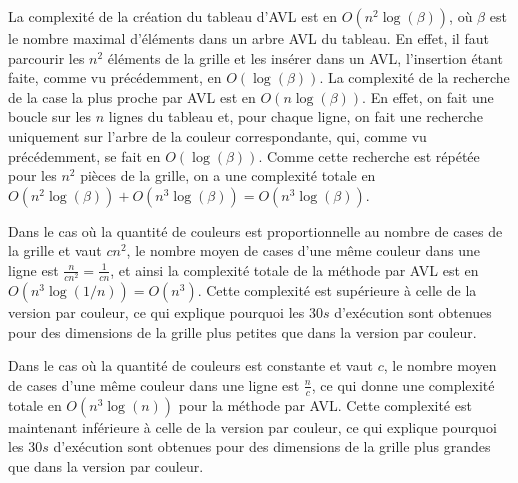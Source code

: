 \documentclass[a4paper,12pt]{article}
\numberwithin{equation}{section}
\begin{document}
La complexité de la création du tableau d'AVL est en $O(n^2 \log(\beta))$, où $\beta$ est le nom\-bre maximal d'éléments dans un arbre AVL du tableau. En effet, il faut parcourir les $n^2$ éléments de la grille et les insérer dans un AVL, l'insertion étant faite, comme vu précédemment, en $O(\log(\beta))$. La complexité de la recherche de la case la plus proche par AVL est en $O(n \log(\beta))$. En effet, on fait une boucle sur les $n$ lignes du tableau \verb@M@ et, pour chaque ligne, on fait une recherche uniquement sur l'arbre de la couleur correspondante, qui, comme vu précédemment, se fait en $O(\log(\beta))$. Comme cette recherche est répétée pour les $n^2$ pièces de la grille, on a une complexité totale en $O(n^2 \log(\beta)) + O(n^3 \log(\beta)) = O(n^3 \log(\beta))$.

Dans le cas où la quantité de couleurs est proportionnelle au nombre de cases de la grille et vaut $c n^2$, le nombre moyen de cases d'une même couleur dans une ligne est $\frac{n}{c n^2} = \frac{1}{c n}$, et ainsi la complexité totale de la méthode par AVL est en $O(n^3 \log(1/n)) = O(n^3)$. Cette complexité est supérieure à celle de la version par couleur, ce qui explique pourquoi les $30 s$ d'exécution sont obtenues pour des dimensions de la grille plus petites que dans la version par couleur.

Dans le cas où la quantité de couleurs est constante et vaut $c$, le nombre moyen de cases d'une même couleur dans une ligne est $\frac{n}{c}$, ce qui donne une complexité totale en $O(n^3 \log(n))$ pour la méthode par AVL. Cette complexité est maintenant inférieure à celle de la version par couleur, ce qui explique pourquoi les $30 s$ d'exécution sont obtenues pour des dimensions de la grille plus grandes que dans la version par couleur.
\end{document}
